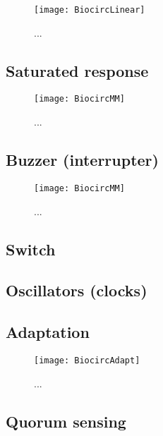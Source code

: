 \begin{figure}
	\begin{center}
		\texttt{[image: BiocircLinear]}
	\end{center}
	\caption{ ... }
	\label{fig:bclin}
\end{figure}
\subsection{Saturated response}
\begin{figure}
	\begin{center}
		\texttt{[image: BiocircMM]}
	\end{center}
	\caption{ ... }
	\label{fig:bcsat}
\end{figure}
\subsection{Buzzer (interrupter)}
\begin{figure}
	\begin{center}
		\texttt{[image: BiocircMM]}
	\end{center}
	\caption{ ... }
	\label{fig:bcsigmoid}
\end{figure}
\subsection{Switch}
\subsection{Oscillators (clocks)}
\subsection{Adaptation}

\begin{figure}
	\begin{center}
		\texttt{[image: BiocircAdapt]}
	\end{center}
	\caption{ ... }
	\label{fig:bcadapt}
\end{figure}

\subsection{Quorum sensing}